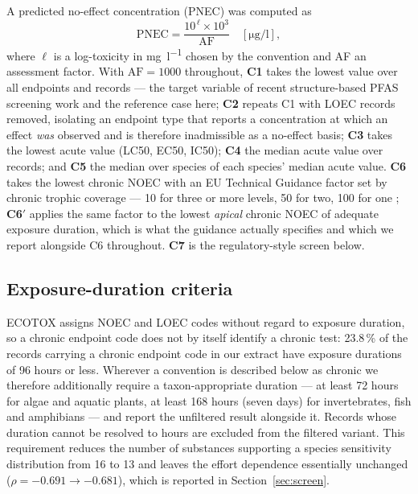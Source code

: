 \documentclass[preprint,12pt]{elsarticle}
\begin{document}
A predicted no-effect concentration (PNEC) was computed as
\begin{equation}
\mathrm{PNEC} = \frac{10^{\,\ell}\times 10^{3}}{\mathrm{AF}}\quad
[\si{\micro\gram\per\litre}],
\end{equation}
where $\ell$ is a log-toxicity in \si{\milli\gram\per\litre} chosen by the
convention and AF an assessment factor. With $\mathrm{AF}=1000$ throughout,
\textbf{C1} takes the lowest value over all endpoints and records --- the target
variable of recent structure-based PFAS screening work and the reference case
here; \textbf{C2} repeats C1 with \textsf{LOEC} records removed, isolating an
endpoint type that reports a concentration at which an effect \emph{was}
observed and is therefore inadmissible as a no-effect basis; \textbf{C3} takes
the lowest acute value (\textsf{LC50}, \textsf{EC50}, \textsf{IC50});
\textbf{C4} the median acute value over records; and \textbf{C5} the median over
species of each species' median acute value. \textbf{C6} takes the lowest
chronic \textsf{NOEC} with an EU Technical Guidance factor set by chronic
trophic coverage --- 10 for three or more levels, 50 for two, 100 for one
\cite{echa2008r10}; \textbf{C6$'$} applies the same factor to the lowest
\emph{apical} chronic \textsf{NOEC} of adequate exposure duration, which is
what the guidance actually specifies and which we report alongside C6
throughout. \textbf{C7} is the regulatory-style screen below.

\subsection{Exposure-duration criteria}

ECOTOX assigns \textsf{NOEC} and \textsf{LOEC} codes without regard to exposure
duration, so a chronic endpoint code does not by itself identify a chronic
test: 23.8\,\% of the records carrying a chronic endpoint code in our extract
have exposure durations of 96 hours or less. Wherever a convention is described
below as chronic we therefore additionally require a taxon-appropriate
duration --- at least 72 hours for algae and aquatic plants, at least 168 hours
(seven days) for invertebrates, fish and amphibians --- and report the
unfiltered result alongside it. Records whose duration cannot be resolved to
hours are excluded from the filtered variant. This requirement reduces the
number of substances supporting a species sensitivity distribution from 16 to
13 and leaves the effort dependence essentially unchanged
($\rho = -0.691 \rightarrow -0.681$), which is reported in Section~\ref{sec:screen}.
\end{document}
